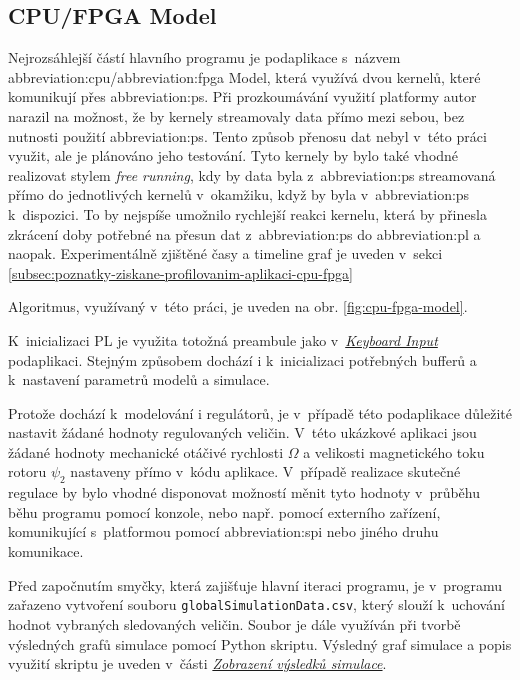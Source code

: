 \documentclass[a4paper, twoside, 11pt]{article}
\begin{document}
		\subsection{CPU/FPGA Model}\label{subsec:cpu-fpga}
			Nejrozsáhlejší částí hlavního programu je podaplikace s~názvem \gls{abbreviation:cpu}/\gls{abbreviation:fpga} Model, která využívá dvou kernelů, které komunikují přes \gls{abbreviation:ps}. Při prozkoumávání využití platformy autor narazil na možnost, že by kernely streamovaly data přímo mezi sebou, bez nutnosti použití \gls{abbreviation:ps}. Tento způsob přenosu dat nebyl v~této práci využit, ale je plánováno jeho testování. Tyto kernely by bylo také vhodné realizovat stylem \textit{free running}, kdy by data byla z~\gls{abbreviation:ps} streamovaná přímo do jednotlivých kernelů v~okamžiku, když by byla v~\gls{abbreviation:ps} k~dispozici. To by nejspíše umožnilo rychlejší reakci kernelu, která by přinesla zkrácení doby potřebné na přesun dat z~\gls{abbreviation:ps} do \gls{abbreviation:pl} a naopak. Experimentálně zjištěné časy a timeline graf je uveden v~sekci \ref{subsec:poznatky-ziskane-profilovanim-aplikaci-cpu-fpga}\par
			Algoritmus, využívaný v~této práci, je uveden na obr. \ref{fig:cpu-fpga-model}.\par
			K~inicializaci PL je využita totožná preambule jako v~\hyperref[subsec:keyboard-input]{\textit{Keyboard Input}} podaplikaci. Stejným způsobem dochází i k~inicializaci potřebných bufferů a k~nastavení parametrů modelů a simulace.\par
			Protože dochází k~modelování i regulátorů, je v~případě této podaplikace důležité nastavit žádané hodnoty regulovaných veličin. V~této ukázkové aplikaci jsou žádané hodnoty mechanické otáčivé rychlosti $\Omega$ a velikosti magnetického toku rotoru $\psi_2$ nastaveny přímo v~kódu aplikace. V~případě realizace skutečné regulace by bylo vhodné disponovat možností měnit tyto hodnoty v~průběhu běhu programu pomocí konzole, nebo např. pomocí externího zařízení, komunikující s~platformou pomocí \gls{abbreviation:spi} nebo jiného druhu komunikace.\par
			Před započnutím smyčky, která zajišťuje hlavní iteraci programu, je v~programu zařazeno vytvoření souboru \texttt{globalSimulationData.csv}, který slouží k~uchování hodnot vybraných sledovaných veličin. Soubor je dále využíván při tvorbě výsledných grafů simulace pomocí Python skriptu. Výsledný graf simulace a popis využití skriptu je uveden v~části \hyperref[subsubsec:zobrazeni-vysledku-simulace]{\textit{Zobrazení výsledků simulace}}.\par
\end{document}
